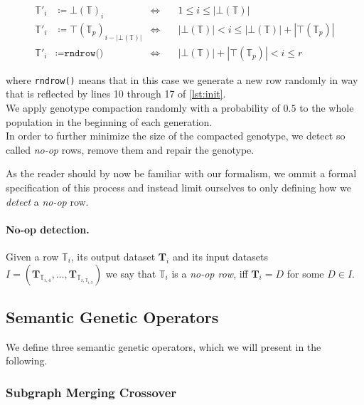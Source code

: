 \begin{equation}
  \begin{aligned}
    \mathbb{T}'_i & \coloneq \bot(\mathbb{T})_i  & \iff \quad & 1 \leq i \leq |\bot(\mathbb{T})| \\
    \mathbb{T}'_i & \coloneq \top(\mathbb{T}_p)_{i-|\bot(\mathbb{T})|}  & \iff \quad & |\bot(\mathbb{T})| < i \leq |\bot(\mathbb{T})| + |\top(\mathbb{T}_p)| \\
    \mathbb{T}'_i & \coloneq \texttt{rndrow()}  & \iff \quad & |\bot(\mathbb{T})| + |\top(\mathbb{T}_p)| < i \leq r
  \end{aligned}
  \label{eq:compacted}
\end{equation}

where \texttt{rndrow()} means that in this case we generate a new row randomly in way that is reflected by lines 10 through 17 of \autoref{lst:init}.\\

We apply genotype compaction randomly with a probability of $0.5$ to the whole population in the beginning of each generation.\\

In order to further minimize the size of the compacted genotype, we detect so called \emph{no-op} rows, remove them and repair the genotype.

As the reader should by now be familiar with our formalism, we ommit a formal specification of this process and instead limit ourselves to only defining how we \emph{detect} a \emph{no-op} row.

\paragraph{No-op detection.} Given a row $\mathbb{T}_i$, its output dataset $\mathbf{T}_i$ and its input datasets $I=\left(\mathbf{T}_{\mathbb{T}_{i, 4}}, \dots, \mathbf{T}_{\mathbb{T}_{i, \mathbb{T}_{i, 3}}}\right)$ we say that $\mathbb{T}_i$ is a \emph{no-op row}, iff $\mathbf{T}_i = D $ for some $ D\in I$.

\subsection{Semantic Genetic Operators}
\label{ssec:sgoapproach}

We define three semantic genetic operators, which we will present in the following.

\subsubsection{Subgraph Merging Crossover}

